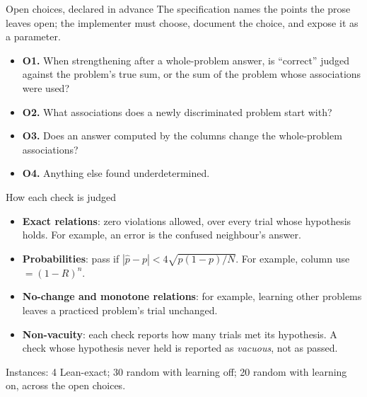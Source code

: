 \documentclass[aspectratio=169,11pt]{beamer}
\begin{document}
\begin{frame}{Open choices, declared in advance}
  The specification names the points the prose leaves open; the implementer must choose, document the choice, and expose it as a parameter.
  \medskip
  \begin{itemize}
    \item \textbf{O1.} When strengthening after a whole-problem answer, is ``correct'' judged against the problem's true sum, or the sum of the problem whose associations were used?
    \item \textbf{O2.} What associations does a newly discriminated problem start with?
    \item \textbf{O3.} Does an answer computed by the columns change the whole-problem associations?
    \item \textbf{O4.} Anything else found underdetermined.
  \end{itemize}
\end{frame}

\begin{frame}{How each check is judged}
  \begin{itemize}
    \item \textbf{Exact relations}: zero violations allowed, over every trial whose hypothesis holds. For example, an error is the confused neighbour's answer.
    \item \textbf{Probabilities}: pass if $|\hat p - p| < 4\sqrt{p(1-p)/N}$. For example, column use $= (1-R)^n$.
    \item \textbf{No-change and monotone relations}: for example, learning other problems leaves a practiced problem's trial unchanged.
    \item \textbf{Non-vacuity}: each check reports how many trials met its hypothesis. A check whose hypothesis never held is reported as \emph{vacuous}, not as passed.
  \end{itemize}
  \medskip
  Instances: 4 Lean-exact; 30 random with learning off; 20 random with learning on, across the open choices.
\end{frame}
\end{document}
